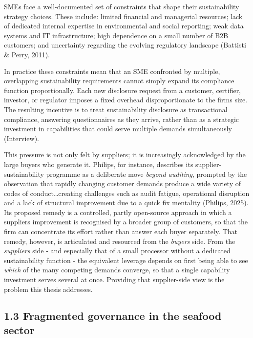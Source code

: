 \documentclass[
]{article}
\begin{document}
SMEs face a well-documented set of constraints that shape their
sustainability strategy choices. These include: limited financial and
managerial resources; lack of dedicated internal expertise in
environmental and social reporting; weak data systems and IT
infrastructure; high dependence on a small number of B2B customers; and
uncertainty regarding the evolving regulatory landscape (Battisti \&
Perry, 2011).

In practice these constraints mean that an SME confronted by multiple,
overlapping sustainability requirements cannot simply expand its
compliance function proportionally. Each new disclosure request from a
customer, certifier, investor, or regulator imposes a fixed overhead
disproportionate to the firm\textquotesingle s size. The resulting
incentive is to treat sustainability disclosure as transactional
compliance, answering questionnaires as they arrive, rather than as a
strategic investment in capabilities that could serve multiple demands
simultaneously (Interview).

This pressure is not only felt by suppliers; it is increasingly
acknowledged by the large buyers who generate it. Philips, for instance,
describes its supplier-sustainability programme as a deliberate move
\emph{beyond auditing}, prompted by the observation that
\textquotesingle rapidly changing customer demands\textquotesingle{}
produce \textquotesingle a wide variety of codes of conduct\ldots creating
challenges such as audit fatigue, operational disruption and a lack of
structural improvement due to a \textquotesingle quick
fix\textquotesingle{} mentality\textquotesingle{} (Philips, 2025). Its
proposed remedy is a controlled, partly open-source approach in which a
supplier\textquotesingle s improvement is recognised by a broader group of
customers, so that the firm can concentrate its effort rather than answer
each buyer separately. That remedy, however, is articulated and resourced
from the \emph{buyer\textquotesingle s} side. From the
\emph{supplier\textquotesingle s} side - and especially that of a small
processor without a dedicated sustainability function - the equivalent
leverage depends on first being able to see \emph{which} of the many
competing demands converge, so that a single capability investment serves
several at once. Providing that supplier-side view is the problem this
thesis addresses.

\subsection{1.3 Fragmented governance in the seafood
sector}\label{fragmented-governance-in-the-seafood-sector}
\end{document}
